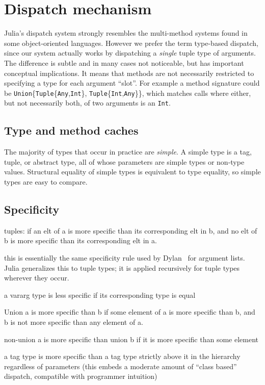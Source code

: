\section{Dispatch mechanism}

Julia's dispatch system strongly resembles the multi-method systems
found in some object-oriented languages.
However we prefer the term type-based dispatch, since our system
actually works by dispatching a \emph{single} tuple type of arguments.
The difference is subtle and in many cases not noticeable, but has
important conceptual implications.
It means that methods are not necessarily restricted to specifying
a type for each argument ``slot''.
For example a method signature could be
\texttt{Union}\{\texttt{Tuple}\{\texttt{Any},\texttt{Int}\}, \texttt{Tuple}\{\texttt{Int},\texttt{Any}\}\},
which matches calls where either, but not necessarily both, of two
arguments is an \texttt{Int}.


\subsection{Type and method caches}

The majority of types that occur in practice are \emph{simple}.
A simple type is a tag, tuple, or abstract type, all of whose parameters
are simple types or non-type values.
Structural equality of simple types is equivalent to type equality,
so simple types are easy to compare.


\subsection{Specificity}

tuples: if an elt of a is more specific than its corresponding elt in b,
and no elt of b is more specific than its corresponding elt in a.

this is essentially the same specificity rule used by Dylan~\cite{dylanlang}
for argument lists.
Julia generalizes this to tuple types; it is applied
recursively for tuple types wherever they occur.

a vararg type is less specific if its corresponding type is equal

Union a is more specific than b if some element of a is
more specific than b, and b is not more specific than any
element of a.

non-union a is more specific than union b if it is more specific than
some element

a tag type is more specific than a tag type strictly above it in the
hierarchy regardless of parameters
(this embeds a moderate amount of ``class based'' dispatch, compatible
with programmer intuition)

